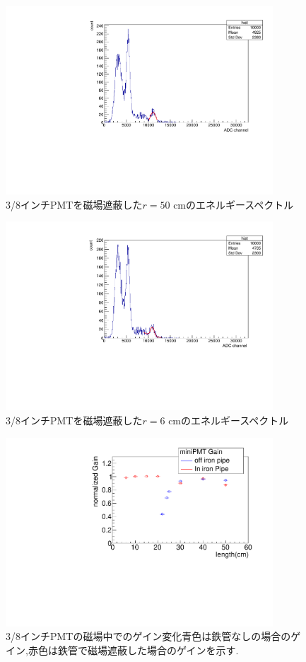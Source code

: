 \begin{figure}[tbp]
	\centering
		\includegraphics[angle=-90,width=10cm]{fig/iguchi/minicoin22.pdf}
	\caption{3/8インチPMTを磁場遮蔽した$r=50$ cmのエネルギースペクトル}
	\label{histminicoin22}
\end{figure}


\begin{figure}[tbp]
	\centering
		\includegraphics[angle=-90,width=10cm]{fig/iguchi/minicoin21.pdf}
	\caption{3/8インチPMTを磁場遮蔽した$r=6$ cmのエネルギースペクトル}
	\label{histminicoin21}
\end{figure}

\begin{figure}[tbp]
	\centering
		\includegraphics[angle=-90,width=10cm]{fig/iguchi/miniPMTgainG.pdf}
	\caption{3/8インチPMTの磁場中でのゲイン変化\newline 青色は鉄管なしの場合のゲイン,赤色は鉄管で磁場遮蔽した場合のゲインを示す.}
	\label{miniPMTgainG}
\end{figure}


